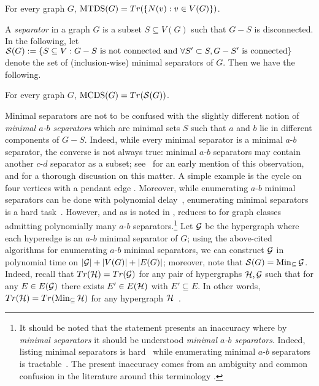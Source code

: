 \begin{proposition}\label{prop:mds-open-neighborhoods}
    For every graph $G$, $\mtds(G)=Tr(\{N(v) : v\in V(G)\})$.
\end{proposition}

A \emph{separator} in a graph $G$ is a subset $S\subseteq V(G)$ such that $G-S$ is disconnected. In the following, let $\S(G):= \{S\subseteq V : G-S~\text{is not connected and}~\forall S' \subset S,  G - S'~\text{is connected}\}$ denote the set of (inclusion-wise) minimal separators of $G$.
Then we have the following.

\begin{proposition}\label{prop:mcds-separators}
    For every graph $G$, $\mcds(G)=Tr(\S(G))$.
\end{proposition}

Minimal separators are not to be confused with the slightly different notion of \emph{minimal $a$-$b$ separators} which are minimal sets $S$ such that $a$ and $b$ lie in different components of $G-S$.
Indeed, while every minimal separator is a minimal $a$-$b$ separator, the converse is not always true: minimal $a$-$b$ separators may contain another $c$-$d$ separator as a subset; see~\cite{golumbic2004algorithmic} for an early mention of this observation, and \cite{brosse2024hardness} for a thorough discussion on this matter.
A simple example is the cycle on four vertices with a pendant edge \cite{brosse2024hardness}.
Moreover, while enumerating $a$-$b$ minimal separators can be done with polynomial delay~\cite{shen1997efficient,kloks1998listing,berry2000generating}, enumerating minimal separators is a hard task~\cite{brosse2024hardness}.
However, and as is noted in \cite{kante2014split}, \cdomenum{} reduces to \transenum{} for graph classes admitting polynomially many $a$-$b$ separators.\footnote{%
    It should be noted that the statement \cite[Corollary 33]{kante2014split} presents an inaccuracy where by \emph{minimal separators} it should be understood \emph{minimal $a$-$b$ separators}. Indeed, listing minimal separators is hard~\cite{brosse2024hardness} while enumerating minimal $a$-$b$ separators is tractable~\cite{kloks1998listing}. 
    The present inaccuracy comes from an ambiguity and common confusion in the literature around this terminology \cite{shen1997efficient,kloks2011feedback}.}
Let $\G$ be the hypergraph where each hyperedge is an $a$-$b$ minimal separator of $G$; using the above-cited algorithms for enumerating $a$-$b$ minimal separators, we can construct $\G$ in polynomial time on $|\G| + |V(G)| + |E(G)|$; moreover, note that $\S(G)=\Min_\subseteq \G$.
Indeed, recall that $Tr(\H)=Tr(\G)$ for any pair of hypergraphs $\H,\G$ such that for any $E\in E(\G)$ there exists $E'\in E(\H)$ with $E'\subseteq E$. In other words, $Tr(\H)=Tr(\Min_\subseteq \H)$ for any hypergraph $\H$~\cite{berge1984hypergraphs}.


